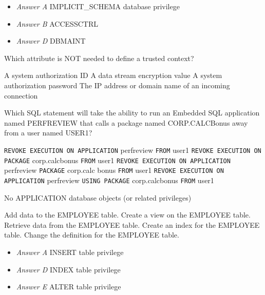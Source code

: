 \documentclass[answers, 11pt]{exam}
\begin{document}
\begin{questions}
\begin{solution}
\begin{itemize}
\item \textit{Answer A} IMPLICIT\_SCHEMA database privilege
\item \textit{Answer B} ACCESSCTRL
\item \textit{Answer D} DBMAINT
\end{itemize}
\end{solution}

\question[1]
Which attribute is NOT needed to define a trusted context?
\begin{choices}
\choice A system authorization ID
\choice A data stream encryption value
\CorrectChoice A system authorization password
\choice The IP address or domain name of an incoming connection
\end{choices}

\question[1]
Which SQL statement will take the ability to run an Embedded SQL application named 
PERF\textunderscore REVIEW that calls a package named CORP.CALC\textunderscore Bonus away from a user named USER1?
\begin{choices}
\choice \texttt{REVOKE EXECUTION ON APPLICATION} perf\textunderscore review \texttt{FROM} user1
\CorrectChoice \texttt{REVOKE EXECUTION ON PACKAGE} corp.calc\textunderscore bonus \texttt{FROM} user1
\choice \texttt{REVOKE EXECUTION ON APPLICATION} perf\textunderscore review \texttt{PACKAGE} corp.calc
\textunderscore bonus \texttt{FROM} user1
\choice \texttt{REVOKE EXECUTION ON APPLICATION} perf\textunderscore review \texttt{USING PACKAGE} corp.calc\textunderscore bonus \texttt{FROM} user1
\end{choices}

\begin{solution}
No APPLICATION database objects (or related privileges)
\end{solution}

\newpage

\begin{choices}
\choice Add data to the EMPLOYEE table.
\CorrectChoice Create a view on the EMPLOYEE table.
\CorrectChoice Retrieve data from the EMPLOYEE table.
\choice Create an index for the EMPLOYEE table.
\choice Change the definition for the EMPLOYEE table.
\end{choices}

\begin{solution}
\begin{itemize}
\item \textit{Answer A} INSERT table privilege
\item \textit{Answer D} INDEX table privilege
\item \textit{Answer E} ALTER table privilege
\end{itemize}
\end{solution}


\end{questions}
\end{document}
